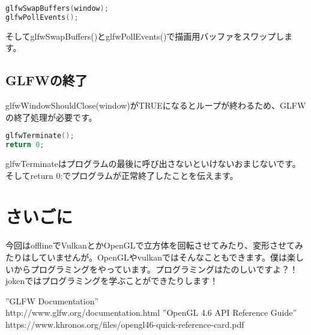 \documentclass[a4paper,titlepage]{jsarticle}
\begin{document}
\begin{lstlisting}[language=C++]
glfwSwapBuffers(window);
glfwPollEvents();
\end{lstlisting}
そしてglfwSwapBuffers()とglfwPollEvents()で描画用バッファをスワップします。

\subsection{GLFWの終了}
glfwWindowShouldClose(window)がTRUEになるとループが終わるため、GLFWの終了処理が必要です。
\begin{lstlisting}[language=C++]
glfwTerminate();
return 0;
\end{lstlisting}
glfwTerminateはプログラムの最後に呼び出さないといけないおまじないです。そしてreturn 0;でプログラムが正常終了したことを伝えます。

\section{さいごに}
今回はofflineでVulkanとかOpenGLで立方体を回転させてみたり、変形させてみたりはしていませんが。OpenGLやvulkanではそんなこともできます。僕は楽しいからプログラミングをやっています。プログラミングはたのしいですよ？！jokenではプログラミングを学ぶことができたりします！

\begin{thebibliography}{99}
 ''GLFW Documentation'' \\
 http://www.glfw.org/documentation.html
 ''OpenGL 4.6 API Reference Guide'' \\
 https://www.khronos.org/files/opengl46-quick-reference-card.pdf
\end{thebibliography}
\end{document}
